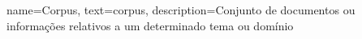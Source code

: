 {
        name=Corpus,
        text=corpus,
        description={Conjunto de documentos ou informações relativos a um determinado tema ou domínio}
}
